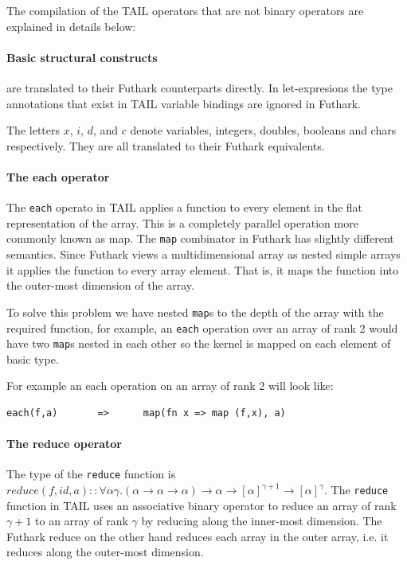 \documentclass[11pt]{article}
\begin{document}
The compilation of the TAIL operators that are not binary operators are explained in details below:\\

\paragraph{Basic structural constructs} are translated to their Futhark counterparts directly.
In let-expresions the type annotations that exist in TAIL variable bindings are ignored in Futhark. 

The letters $x$, $i$, $d$, and $c$ denote variables, integers, doubles, booleans and chars respectively.
They are all translated to their Futhark equivalents.\\

\paragraph{The each operator} 
 
The {\tt each} operato in TAIL applies a function to every element in the flat representation of the array.
This is a completely parallel operation more commonly known as map.
The {\tt map} combinator in Futhark has slightly different semantics\cite{ElsmanDybdal:Array:2014}.
Since Futhark views a multidimensional array as nested simple arrays it applies the function to every array element.
That is, it maps the function into the outer-most dimension of the array\cite{TroelsHenriksen}.
 
To solve this problem we have nested {\tt map}s to the depth of the array with the required function,
for example, an {\tt each} operation over an array of rank 2 would have two {\tt map}s nested in each other so the kernel is
mapped on each element of basic type.
 
For example an each operation on an array of rank 2 will look like:
\begin{lstlisting}[numbers=none,frame=none]
each(f,a)       =>      map(fn x => map (f,x), a)
\end{lstlisting}


\paragraph{The reduce operator} 
The type of the {\tt reduce} function is $reduce(f,id,a) :: \forall\alpha\gamma.(\alpha \to \alpha \to \alpha) \to \alpha \to [\alpha]^{\gamma+1} \to [\alpha]^\gamma$.
The {\tt reduce} function in TAIL uses an associative binary operator to reduce an array of rank
$\gamma+1$ to an array of rank $\gamma$ by reducing along the inner-most dimension\cite{ElsmanDybdal:Array:2014}.
The Futhark reduce on the other hand reduces each array in the outer array, i.e. it reduces along the outer-most dimension\cite{TroelsHenriksen}.
 
\end{document}
